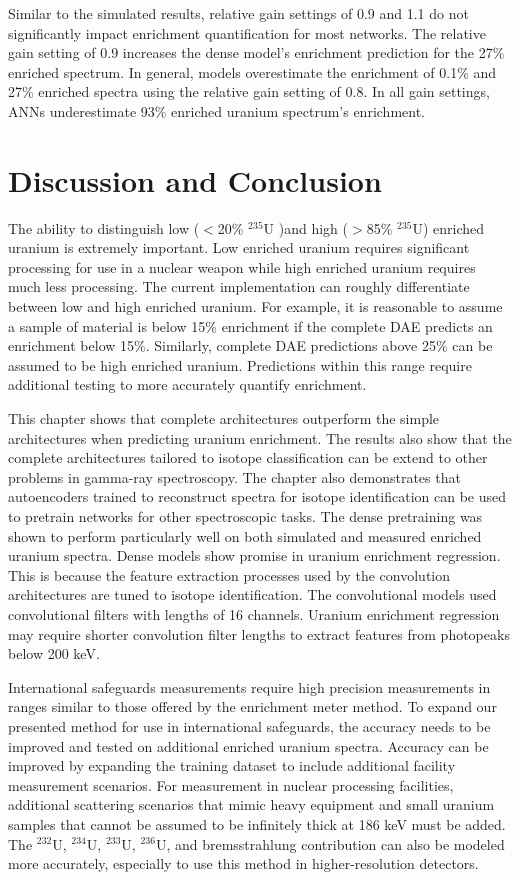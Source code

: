 Similar to the simulated results, relative gain settings of 0.9 and 1.1 do not significantly impact enrichment quantification for most networks. The relative gain setting of 0.9 increases the dense model's enrichment prediction for the 27\% enriched spectrum. In general, models overestimate the enrichment of 0.1\% and 27\% enriched spectra using the relative gain setting of 0.8. In all gain settings, ANNs underestimate 93\% enriched uranium spectrum's enrichment.


\section{Discussion and Conclusion}

The ability to distinguish low ($<$20\% $^{235}$U )and high ($>$85\% $^{235}$U) enriched uranium is extremely important. Low enriched uranium requires significant processing for use in a nuclear weapon while high enriched uranium requires much less processing. The current implementation can roughly differentiate between low and high enriched uranium. For example, it is reasonable to assume a sample of material is below 15\% enrichment if the complete DAE predicts an enrichment below 15\%. Similarly, complete DAE predictions above 25\% can be assumed to be high enriched uranium. Predictions within this range require additional testing to more accurately quantify enrichment.

This chapter shows that complete architectures outperform the simple architectures when predicting uranium enrichment. The results also show that the complete architectures tailored to isotope classification can be extend to other problems in gamma-ray spectroscopy. The chapter also demonstrates that autoencoders trained to reconstruct spectra for isotope identification can be used to pretrain networks for other spectroscopic tasks. The dense pretraining was shown to perform particularly well on both simulated and measured enriched uranium spectra. Dense models show promise in uranium enrichment regression. This is because the feature extraction processes used by the convolution architectures are tuned to isotope identification. The convolutional models used convolutional filters with lengths of 16 channels. Uranium enrichment regression may require shorter convolution filter lengths to extract features from photopeaks below 200 keV.

International safeguards measurements require high precision measurements in ranges similar to those offered by the enrichment meter method. To expand our presented method for use in international safeguards, the accuracy needs to be improved and tested on additional enriched uranium spectra. Accuracy can be improved by expanding the training dataset to include additional facility measurement scenarios. For measurement in nuclear processing facilities, additional scattering scenarios that mimic heavy equipment and small uranium samples that cannot be assumed to be infinitely thick at 186 keV must be added. The $^{232}$U, $^{234}$U, $^{233}$U, $^{236}$U, and bremsstrahlung contribution can also be modeled more accurately, especially to use this method in higher-resolution detectors.


